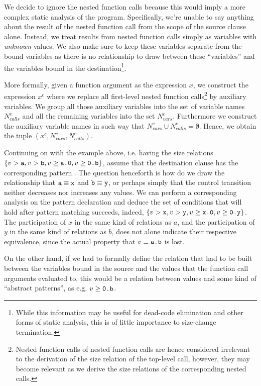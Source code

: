 We decide to ignore the nested function calls because this would imply a more
complex static analysis of the program. Specifically, we're unable to say
anything about the result of the nested function call from the scope of the
source clause alone. Instead, we treat results from nested function calls
simply as variables with \emph{unknown} values. We also make sure to keep these
variables separate from the bound variables as there is no relationship to draw
between these ``variables'' and the variables bound in the
destination\footnote{While this information may be useful for dead-code
elimination and other forms of static analysis, this is of little importance to
size-change termination.}.

More formally, given a function argument as the expression $x$, we construct
the expression $x^c$ where we replace all first-level nested function
calls\footnote{Nested function calls of nested function calls are hence
considered irrelevant to the derivation of the size relation of the top-level
call, however, they may become relevant as we derive the size relations of the
corresponding nested calls.} by auxiliary variables.  We group all those
auxiliary variables into the set of variable names $N_{calls}^c$ and all the
remaining variables into the set $N_{vars}^c$.  Furthermore we construct the
auxiliary variable names in such way that $N_{vars}^c\cup
N_{calls}^c=\emptyset$.  Hence, we obtain the tuple
$(x^c,N_{vars}^c,N_{calls}^c)$.

Continuing on with the example above, i.e. having the size relations
$\{v>\text{{\ttfamily a}}, v> \text{{\ttfamily b}}, v\geq \text{{\ttfamily a.0}}, v\geq \text{{\ttfamily0.b}}\}$, assume
that the destination clause has the corresponding pattern . The
question henceforth is how do we draw the relationship that
$\text{{\ttfamily a}}\equiv\text{{\ttfamily x}}$ and $\text{{\ttfamily b}}\equiv\text{{\ttfamily y}}$, or perhaps simply
that the control transition neither decreases nor increases any values. We can
perform a corresponding analysis on the pattern declaration and deduce the set
of conditions that will hold after pattern matching succeeds, indeed,
$\{v>\text{{\ttfamily x}}, v> \text{{\ttfamily y}}, v\geq \text{{\ttfamily x.0}}, v\geq \text{{\ttfamily0.y}}\}$. The
participation of $x$ in the same kind of relations as $a$, and the
participation of $y$ in the same kind of relations as $b$, does not alone
indicate their respective equivalence, since the actual property that
$v\equiv\text{{\ttfamily a.b}}$ is lost.

On the other hand, if we had to formally define the relation that had to be
built between the variables bound in the source and the values that the
function call arguments evaluated to, this would be a relation between values
and some kind of ``abstract patterns'', as e.g. $v\geq\text{{\ttfamily0.b}}$.

